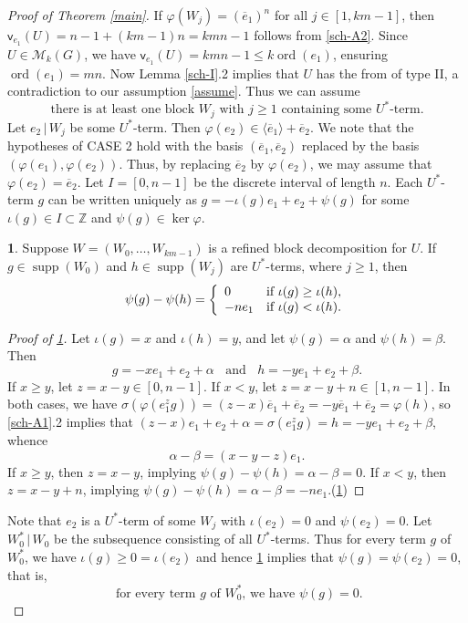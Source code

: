 \documentclass[11pt]{amsart}
\theoremstyle{definition}
\newtheorem{claim}{}[theorem]
\newcommand{\Z}{\mathbb Z}
\DeclareMathOperator{\ord}{ord}
\DeclareMathOperator{\supp}{supp}
\newcommand{\la}{\langle}
\newcommand{\ra}{\rangle}
\newcommand{\be}{\begin{equation}}
\newcommand{\ee}{\end{equation}}
\newcommand{\und}{\;\mbox{ and }\;}
\newcommand{\vp}{\mathsf v}
\renewcommand{\t}{\, | \,}
\numberwithin{equation}{section}
\begin{document}
\begin{proof}[Proof of Theorem \ref{main}]
	If $\varphi(W_j)=(\overline e_1)^n$ for all $j\in [1, km-1]$, then 
	$\vp_{e_1}(U)=n-1+(km-1)n=kmn-1$ follows from \ref{sch-A2}. Since $U\in \mathcal M_k(G)$, we have $\vp_{e_1}(U)=kmn-1\le k\ord(e_1)$, ensuring $\ord(e_1)=mn$. Now Lemma \ref{sch-I}.2 implies that $U$ has the from of type II, a contradiction to our assumption \eqref{assume}.
	Thus we can assume 
	\be\label{at_least_one}
	\text{there is at least one block $W_j$ with $j\geq 1$ containing some $U^*$-term.}
	\ee
	 Let $e_2\t W_j$ be some $U^*$-term.
	 Then  $\varphi(e_2)\in \la \overline e_1\ra+\overline e_2$.
	We note that the hypotheses of CASE 2 hold with the basis $(\overline e_1,\overline e_2)$ replaced by the basis $(\varphi (e_1),\varphi (e_2))$. Thus, by replacing $\overline e_2$ by  $\varphi (e_2)$, we may assume that $\varphi(e_2)=\overline e_2$.
	Let $I=[0,n-1]$ be the discrete interval of length $n$.  Each $U^*$-term $g$  can be written uniquely as $g=-\iota(g)e_1+e_2+\psi(g)$ for some $\iota(g)\in I\subset \Z$ and $\psi(g)\in \ker\varphi$.
	

	
	
	\begin{claim}
		\label{sch-A3} Suppose $W=(W_0,\ldots, W_{km-1})$ is a  refined block decomposition for $U$. If $g\in \supp(W_0)$ and $h\in \supp(W_j)$ are  $U^*$-terms, where $j\geq 1$, then
		$$\psi(g)-\psi(h)=\left\{
		\begin{array}{ll}
			0 & \hbox{if $\iota(g)\geq \iota(h)$,} \\
			-ne_1 & \hbox{if $\iota(g)<\iota(h)$.}
		\end{array}
		\right.$$
	\end{claim}

	
	
	\begin{proof}[Proof of \ref{sch-A3}]
		Let $\iota(g)=x$ and  $\iota(h)=y$,  and let $\psi(g)=\alpha$ and $\psi(h)=\beta$. Then $$g=-xe_1+e_2+\alpha\;\und\; h=-ye_1+e_2+\beta.$$
		If $x\geq y$, let $z=x-y\in [0,n-1]$. If $x<y$, let $z=x-y+n\in [1,n-1]$.
		In both cases, we have $\sigma(\varphi(e_1^{z} g))=(z-x)\overline e_1+\overline e_2=-y\overline e_1+\overline e_2=\varphi(h)$, so  \ref{sch-A1}.2 implies  that $(z-x)e_1+e_2+\alpha=\sigma(e_1^z g)=h=-ye_1+e_2+\beta$, whence $$\alpha-\beta=(x-y-z)e_1.$$
		If $x\geq y$, then $z=x-y$, implying $\psi(g)-\psi(h)=\alpha-\beta=0$. If $x< y$, then $z=x-y+n$, implying $\psi(g)-\psi(h)=\alpha-\beta=-ne_1$.\qedhere (\ref{sch-A3})
	\end{proof}
	
	Note that $e_2$ is a $U^*$-term of some $W_j$ with $\iota(e_2)=0$ and $\psi(e_2)=0$. Let $W_0^*\t W_0$ be the subsequence consisting of all $U^*$-terms. 
	Thus for every term $g$ of $W_0^*$, we have $\iota(g)\ge 0=\iota(e_2)$ and hence \ref{sch-A3} implies that $\psi(g)=\psi(e_2)=0$, that is, 
	\be\label{psi-W0}
	\text{ for every term $g$ of $W_0^*$, we have $\psi(g)=0$.}
	\ee
	

\end{proof}
\end{document}
